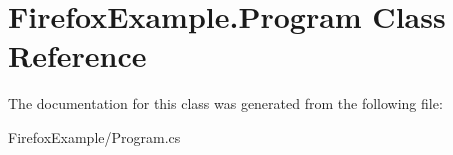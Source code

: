 \hypertarget{class_firefox_example_1_1_program}{}\section{Firefox\+Example.\+Program Class Reference}
\label{class_firefox_example_1_1_program}


The documentation for this class was generated from the following file\+:\begin{DoxyCompactItemize}
\item 
Firefox\+Example/Program.\+cs\end{DoxyCompactItemize}
